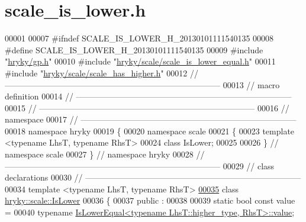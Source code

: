 \hypertarget{scale__is__lower_8h_source}{\section{scale\-\_\-is\-\_\-lower.\-h}
}

\begin{DoxyCode}
00001 
00007 \textcolor{preprocessor}{#ifndef SCALE\_IS\_LOWER\_H\_20130101111540135}
00008 \textcolor{preprocessor}{}\textcolor{preprocessor}{#define SCALE\_IS\_LOWER\_H\_20130101111540135}
00009 \textcolor{preprocessor}{}\textcolor{preprocessor}{#include "\hyperlink{gp_8h}{hryky/gp.h}"}
00010 \textcolor{preprocessor}{#include "\hyperlink{scale__is__lower__equal_8h}{hryky/scale/scale_is_lower_equal.h}"}
00011 \textcolor{preprocessor}{#include "\hyperlink{scale__has__higher_8h}{hryky/scale/scale_has_higher.h}"}
00012 \textcolor{comment}{//
      ------------------------------------------------------------------------------}
00013 \textcolor{comment}{// macro definition}
00014 \textcolor{comment}{//
      ------------------------------------------------------------------------------}
00015 \textcolor{comment}{//
      ------------------------------------------------------------------------------}
00016 \textcolor{comment}{// namespace}
00017 \textcolor{comment}{//
      ------------------------------------------------------------------------------}
00018 \textcolor{keyword}{namespace }hryky
00019 \{
00020 \textcolor{keyword}{namespace }scale
00021 \{
00023     \textcolor{keyword}{template} <\textcolor{keyword}{typename} LhsT, \textcolor{keyword}{typename} RhsT>
00024     \textcolor{keyword}{class }IsLower;
00025 
00026 \} \textcolor{comment}{// namespace scale}
00027 \} \textcolor{comment}{// namespace hryky}
00028 \textcolor{comment}{//
      ------------------------------------------------------------------------------}
00029 \textcolor{comment}{// class declarations}
00030 \textcolor{comment}{//
      ------------------------------------------------------------------------------}
00034 \textcolor{comment}{}\textcolor{keyword}{template} <\textcolor{keyword}{typename} LhsT, \textcolor{keyword}{typename} RhsT>
\hypertarget{scale__is__lower_8h_source_l00035}{}\hyperlink{classhryky_1_1scale_1_1_is_lower}{00035} \textcolor{keyword}{class }\hyperlink{classhryky_1_1scale_1_1_is_lower}{hryky::scale::IsLower}
00036 \{
00037 \textcolor{keyword}{public} :
00038 
00039     \textcolor{keyword}{static} \textcolor{keywordtype}{bool} \textcolor{keyword}{const} value =
00040         \textcolor{keyword}{typename} \hyperlink{classhryky_1_1scale_1_1_is_lower_equal}{IsLowerEqual<typename LhsT::higher_type, RhsT>::value};

\end{DoxyCode}
